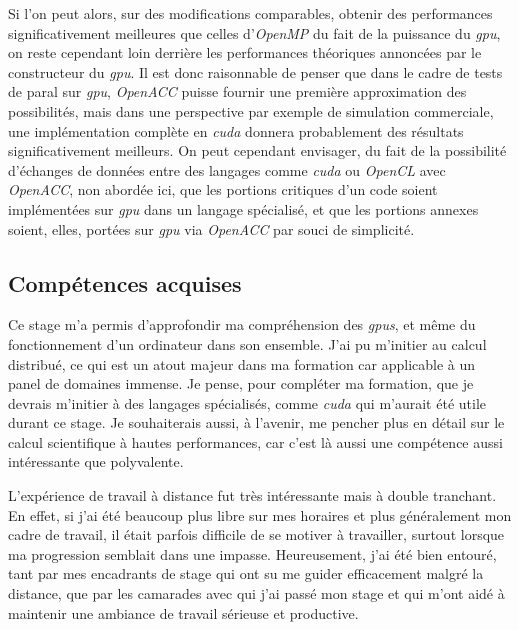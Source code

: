 \documentclass{article}
\begin{document}
Si l'on peut alors, sur des modifications comparables, obtenir des performances significativement meilleures que celles d'\textit{OpenMP} du fait de la puissance du \textit{\gls{gpu}}, on reste cependant loin derrière les performances théoriques annoncées par le constructeur du \textit{\gls{gpu}}. Il est donc raisonnable de penser que dans le cadre de tests de \gls{paral} sur \textit{\gls{gpu}}, \textit{OpenACC} puisse fournir une première approximation des possibilités, mais dans une perspective par exemple de simulation commerciale, une implémentation complète en \textit{\gls{cuda}} donnera probablement des résultats significativement meilleurs. On peut cependant envisager, du fait de la possibilité d'échanges de données entre des langages comme \textit{\gls{cuda}} ou \textit{OpenCL} avec \textit{OpenACC}, non abordée ici, que les portions critiques d'un code soient implémentées sur \textit{\gls{gpu}} dans un langage spécialisé, et que les portions annexes soient, elles, portées sur \textit{\gls{gpu}} via \textit{OpenACC} par souci de simplicité.

\subsection{Compétences acquises}

Ce stage m'a permis d'approfondir ma compréhension des \textit{\gls{gpu}s}, et même du fonctionnement d'un ordinateur dans son ensemble. J'ai pu m'initier au calcul distribué, ce qui est un atout majeur dans ma formation car applicable à un panel de domaines immense. Je pense, pour compléter ma formation, que je devrais m'initier à des langages spécialisés, comme \textit{\gls{cuda}} qui m'aurait été utile durant ce stage. Je souhaiterais aussi, à l'avenir, me pencher plus en détail sur le calcul scientifique à hautes performances, car c'est là aussi une compétence aussi intéressante que polyvalente.

L'expérience de travail à distance fut très intéressante mais à double tranchant. En effet, si j'ai été beaucoup plus libre sur mes horaires et plus généralement mon cadre de travail, il était parfois difficile de se motiver à travailler, surtout lorsque ma progression semblait dans une impasse. Heureusement, j'ai été bien entouré, tant par mes encadrants de stage qui ont su me guider efficacement malgré la distance, que par les camarades avec qui j'ai passé mon stage et qui m'ont aidé à maintenir une ambiance de travail sérieuse et productive.
\end{document}
